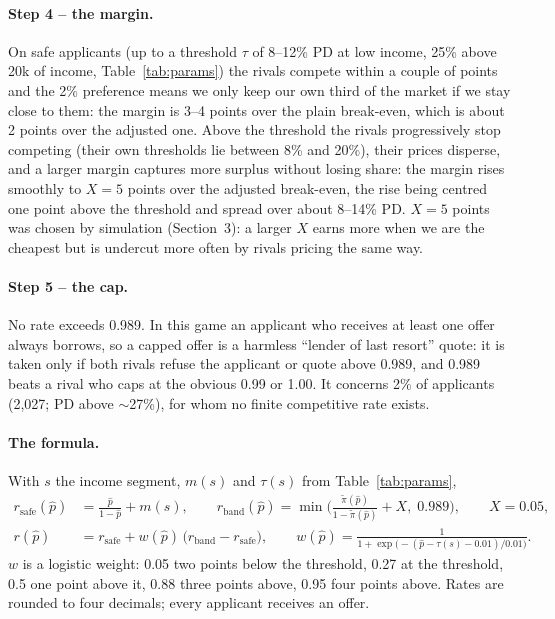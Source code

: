 \documentclass[11pt,a4paper]{article}
\begin{document}
\paragraph{Step 4 -- the margin.} On safe applicants (up to a threshold $\tau$ of 8--12\% PD at low income, 25\% above
20k of income, Table~\ref{tab:params}) the rivals compete within a couple of points and the 2\% preference means we only
keep our own third of the market if we stay close to them: the margin is 3--4 points over the plain break-even, which is
about 2 points over the adjusted one. Above the threshold the rivals progressively stop competing (their own thresholds
lie between 8\% and 20\%), their prices disperse, and a larger margin captures more surplus without losing share: the
margin rises smoothly to $X = 5$ points over the adjusted break-even, the rise being centred one point above the threshold
and spread over about 8--14\% PD. $X = 5$ points was chosen by simulation (Section~3): a larger $X$ earns more when we are
the cheapest but is undercut more often by rivals pricing the same way.

\paragraph{Step 5 -- the cap.} No rate exceeds 0.989. In this game an applicant who receives at least one offer always
borrows, so a capped offer is a harmless ``lender of last resort'' quote: it is taken only if both rivals refuse the
applicant or quote above 0.989, and 0.989 beats a rival who caps at the obvious 0.99 or 1.00. It concerns 2\% of
applicants (2,027; PD above $\sim$27\%), for whom no finite competitive rate exists.

\paragraph{The formula.} With $s$ the income segment, $m(s)$ and $\tau(s)$ from Table~\ref{tab:params},
\begin{align}
r_{\text{safe}}(\hat p) &= \frac{\hat p}{1-\hat p} + m(s), \qquad
r_{\text{band}}(\hat p) = \min\!\Big(\frac{\tilde\pi(\hat p)}{1-\tilde\pi(\hat p)} + X,\; 0.989\Big), \qquad X = 0.05,\\[4pt]
r(\hat p) &= r_{\text{safe}} + w(\hat p)\,\big(r_{\text{band}} - r_{\text{safe}}\big), \qquad
w(\hat p) = \frac{1}{1+\exp\!\big(-(\hat p - \tau(s) - 0.01)/0.01\big)} .
\label{eq:rule}
\end{align}
$w$ is a logistic weight: 0.05 two points below the threshold, 0.27 at the threshold, 0.5 one point above it, 0.88 three
points above, 0.95 four points above. Rates are rounded to four decimals; every applicant receives an offer.
\end{document}

